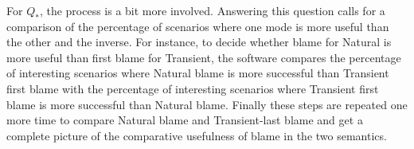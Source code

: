 For $Q_*$, the process is a bit more involved. Answering this question calls for
a comparison of the percentage of scenarios where one mode is more useful than
the other and the inverse.  For instance, to decide whether blame for Natural is
more useful than first blame for Transient, the software compares the percentage
of interesting scenarios where Natural blame is more successful than Transient
first blame with the percentage of interesting scenarios where Transient first
blame is more successful than Natural blame.  Finally these steps are repeated
one more time to compare Natural blame and Transient-last blame and get a
complete picture of the comparative usefulness of blame in the two semantics.


